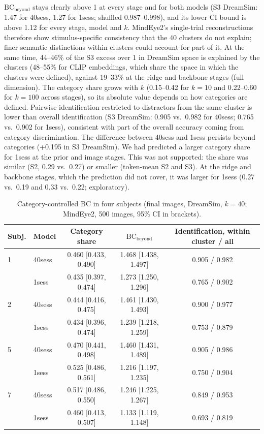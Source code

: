 \documentclass[11pt,a4paper]{article}
\begin{document}
$\mathrm{BC}_\text{beyond}$ stays clearly above 1 at every stage and for both
models (S3 DreamSim: 1.47 for 40sess, 1.27 for 1sess; shuffled 0.987--0.998),
and its lower CI bound is above 1.12 for every stage, model and $k$.
MindEye2's single-trial reconstructions therefore show stimulus-specific
consistency that the 40 clusters do not explain; finer semantic distinctions
within clusters could account for part of it. At the same time, 44--46\% of the S3
excess over 1 in DreamSim space is explained by the clusters (48--55\% for CLIP
embeddings, which share the space in which the clusters were defined), against
19--33\% at the ridge and backbone stages (full dimension). The category share grows with $k$ (0.15--0.42
for $k=10$ and 0.22--0.60 for $k=100$ across stages), so its absolute value
depends on how categories are defined. Pairwise identification restricted to
distractors from the same cluster is lower than overall identification (S3
DreamSim: 0.905 vs.\ 0.982 for 40sess; 0.765 vs.\ 0.902 for 1sess), consistent
with part of the overall accuracy coming from category discrimination. The
difference between 40sess and 1sess persists beyond categories (+0.195 in S3
DreamSim). We had predicted a larger category share for 1sess at the prior and
image stages. This was not supported: the share was similar (S2, 0.29 vs.\
0.27) or smaller (token-mean S2 and S3). At the ridge and backbone stages, which
the prediction did not cover, it was larger for 1sess (0.27 vs.\ 0.19 and 0.33
vs.\ 0.22; exploratory).

\begin{table}[tbp]
\centering
\caption{Category-controlled BC in four subjects (final images, DreamSim, $k=40$;
  MindEye2, 500 images, 95\% CI in brackets).}
\label{tab:beyond4}
\footnotesize
\setlength{\tabcolsep}{4pt}
\begin{tabular}{llccc}
\toprule
Subj. & Model & Category share & $\mathrm{BC}_\text{beyond}$ & Identification, within cluster / all \\
\midrule
1 & 40sess & 0.460 [0.433, 0.490] & 1.468 [1.438, 1.497] & 0.905 / 0.982 \\
  & 1sess  & 0.435 [0.397, 0.474] & 1.273 [1.250, 1.296] & 0.765 / 0.902 \\
2 & 40sess & 0.444 [0.416, 0.475] & 1.461 [1.430, 1.493] & 0.900 / 0.977 \\
  & 1sess  & 0.434 [0.396, 0.474] & 1.239 [1.218, 1.259] & 0.753 / 0.879 \\
5 & 40sess & 0.470 [0.441, 0.498] & 1.460 [1.431, 1.489] & 0.905 / 0.986 \\
  & 1sess  & 0.525 [0.486, 0.561] & 1.216 [1.197, 1.235] & 0.750 / 0.904 \\
7 & 40sess & 0.517 [0.486, 0.550] & 1.246 [1.225, 1.267] & 0.849 / 0.953 \\
  & 1sess  & 0.460 [0.413, 0.507] & 1.133 [1.119, 1.148] & 0.693 / 0.819 \\
\bottomrule
\end{tabular}
\end{table}
\end{document}
